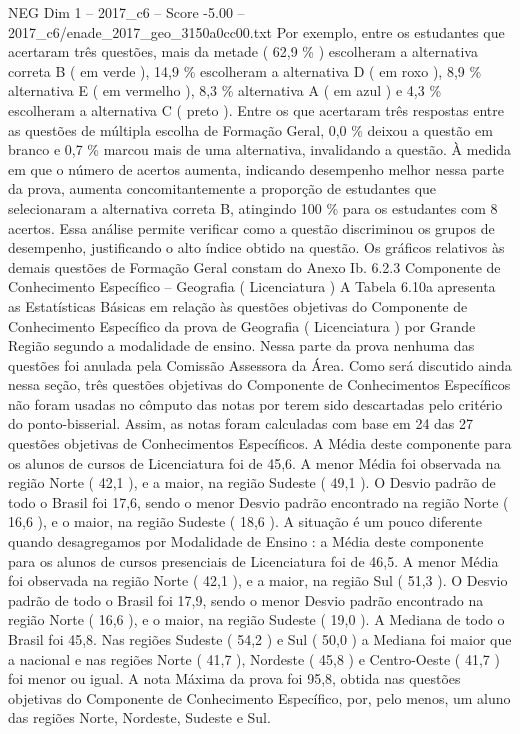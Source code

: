 \begin{textsample}{NEG Dim 1 – 2017\_c6 – Score -5.00 – 2017\_c6/enade\_2017\_geo\_3150a0cc00.txt}
Por exemplo, entre os estudantes que acertaram três questões, mais da metade ( 62,9 \% ) escolheram a alternativa correta B ( em verde ), 14,9 \% escolheram a alternativa D ( em roxo ), 8,9 \% alternativa E ( em vermelho ), 8,3 \% alternativa A ( em azul ) e 4,3 \% escolheram a alternativa C ( preto ).
Entre os que acertaram três respostas entre as questões de múltipla escolha de Formação Geral, 0,0 \% deixou a questão em branco e 0,7 \% marcou mais de uma alternativa, invalidando a questão.
À medida em que o número de acertos aumenta, indicando desempenho melhor nessa parte da prova, aumenta concomitantemente a proporção de estudantes que selecionaram a alternativa correta B, atingindo 100 \% para os estudantes com 8 acertos.
Essa análise permite verificar como a questão discriminou os grupos de desempenho, justificando o alto índice obtido na questão.
Os gráficos relativos às demais questões de Formação Geral constam do Anexo Ib. 6.2.3 Componente de Conhecimento Específico – Geografia ( Licenciatura ) A Tabela 6.10a apresenta as Estatísticas Básicas em relação às questões objetivas do Componente de Conhecimento Específico da prova de Geografia ( Licenciatura ) por Grande Região segundo a modalidade de ensino.
Nessa parte da prova nenhuma das questões foi anulada pela Comissão Assessora da Área.
Como será discutido ainda nessa seção, três questões objetivas do Componente de Conhecimentos Específicos não foram usadas no cômputo das notas por terem sido descartadas pelo critério do ponto-bisserial.
Assim, as notas foram calculadas com base em 24 das 27 questões objetivas de Conhecimentos Específicos.
A Média deste componente para os alunos de cursos de Licenciatura foi de 45,6.
A menor Média foi observada na região Norte ( 42,1 ), e a maior, na região Sudeste ( 49,1 ).
O Desvio padrão de todo o Brasil foi 17,6, sendo o menor Desvio padrão encontrado na região Norte ( 16,6 ), e o maior, na região Sudeste ( 18,6 ).
A situação é um pouco diferente quando desagregamos por Modalidade de Ensino : a Média deste componente para os alunos de cursos presenciais de Licenciatura foi de 46,5.
A menor Média foi observada na região Norte ( 42,1 ), e a maior, na região Sul ( 51,3 ).
O Desvio padrão de todo o Brasil foi 17,9, sendo o menor Desvio padrão encontrado na região Norte ( 16,6 ), e o maior, na região Sudeste ( 19,0 ).
A Mediana de todo o Brasil foi 45,8.
Nas regiões Sudeste ( 54,2 ) e Sul ( 50,0 ) a Mediana foi maior que a nacional e nas regiões Norte ( 41,7 ), Nordeste ( 45,8 ) e Centro-Oeste ( 41,7 ) foi menor ou igual.
A nota Máxima da prova foi 95,8, obtida nas questões objetivas do Componente de Conhecimento Específico, por, pelo menos, um aluno das regiões Norte, Nordeste, Sudeste e Sul.

\end{textsample}
